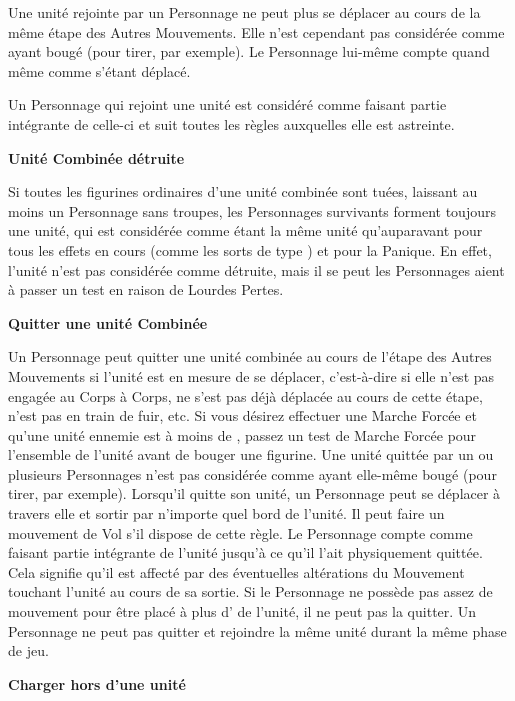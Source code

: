 Une unité rejointe par un Personnage ne peut plus se déplacer au cours de la même étape des Autres Mouvements. Elle n'est cependant pas considérée comme ayant bougé (pour tirer, par exemple). Le Personnage lui-même compte quand même comme s'étant déplacé.

Un Personnage qui rejoint une unité est considéré comme faisant partie intégrante de celle-ci et suit toutes les règles auxquelles elle est astreinte.

\noindent\textbf{Unité Combinée détruite}

Si toutes les figurines ordinaires d'une unité combinée sont tuées, laissant au moins un Personnage sans troupes, les Personnages survivants forment toujours une unité, qui est considérée comme étant la même unité qu'auparavant pour tous les effets en cours (comme les sorts de type \lastsoneturn{}) et pour la Panique. En effet, l'unité n'est pas considérée comme détruite, mais il se peut les Personnages aient à passer un test en raison de Lourdes Pertes.

\noindent\textbf{Quitter une unité Combinée}

Un Personnage peut quitter une unité combinée au cours de l'étape des Autres Mouvements si l'unité est en mesure de se déplacer, c'est-à-dire si elle n'est pas engagée au Corps à Corps, ne s'est pas déjà déplacée au cours de cette étape, n'est pas en train de fuir, etc. Si vous désirez effectuer une Marche Forcée et qu'une unité ennemie est à moins de , passez un test de Marche Forcée pour l'ensemble de l'unité avant de bouger une figurine. Une unité quittée par un ou plusieurs Personnages n'est pas considérée comme ayant elle-même bougé (pour tirer, par exemple). Lorsqu'il quitte son unité, un Personnage peut se déplacer à travers elle et sortir par n'importe quel bord de l'unité. Il peut faire un mouvement de Vol s'il dispose de cette règle. Le Personnage compte comme faisant partie intégrante de l'unité jusqu'à ce qu'il l'ait physiquement quittée. Cela signifie qu'il est affecté par des éventuelles altérations du Mouvement touchant l'unité au cours de sa sortie. Si le Personnage ne possède pas assez de mouvement pour être placé à plus d' de l'unité, il ne peut pas la quitter. Un Personnage ne peut pas quitter et rejoindre la même unité durant la même phase de jeu.

\noindent\textbf{Charger hors d'une unité}


